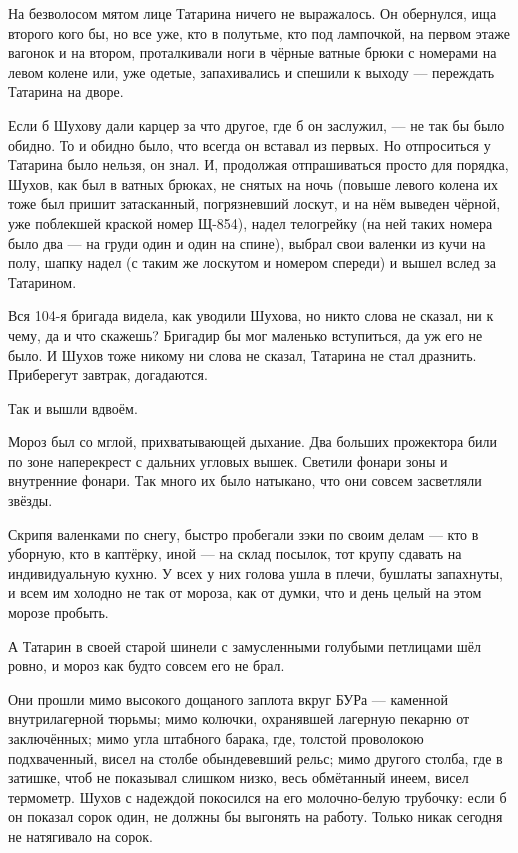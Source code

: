 На безволосом мятом лице Татарина ничего не выражалось. Он обернулся, ища второго кого бы, но
все уже, кто в полутьме, кто под лампочкой, на первом этаже вагонок и на втором, проталкивали
ноги в чёрные ватные брюки с номерами на левом колене или, уже одетые, запахивались и спешили
к выходу --- переждать Татарина на дворе.

Если б Шухову дали карцер за что другое, где б он заслужил, --- не так бы было обидно. То и
обидно было, что всегда он вставал из первых. Но отпроситься у Татарина было нельзя, он знал.
И, продолжая отпрашиваться просто для порядка, Шухов, как был в ватных брюках, не снятых на
ночь (повыше левого колена их тоже был пришит затасканный, погрязневший лоскут, и на нём
выведен чёрной, уже поблекшей краской номер Щ-854), надел телогрейку (на ней таких номера было
два --- на груди один и один на спине), выбрал свои валенки из кучи на полу, шапку надел (с таким
же лоскутом и номером спереди) и вышел вслед за Татарином.

Вся 104-я бригада видела, как уводили Шухова, но никто слова не сказал, ни к чему, да и что
скажешь? Бригадир бы мог маленько вступиться, да уж его не было. И Шухов тоже никому ни слова
не сказал, Татарина не стал дразнить. Приберегут завтрак, догадаются.

Так и вышли вдвоём.

Мороз был со мглой, прихватывающей дыхание. Два больших прожектора били по зоне наперекрест
с дальних угловых вышек. Светили фонари зоны и внутренние фонари. Так много их было натыкано,
что они совсем засветляли звёзды.

Скрипя валенками по снегу, быстро пробегали зэки по своим делам --- кто в уборную, кто в
каптёрку, иной --- на склад посылок, тот крупу сдавать на индивидуальную кухню. У всех у них
голова ушла в плечи, бушлаты запахнуты, и всем им холодно не так от мороза, как от думки, что и
день целый на этом морозе пробыть.

А Татарин в своей старой шинели с замусленными голубыми петлицами шёл ровно, и мороз как
будто совсем его не брал.

Они прошли мимо высокого дощаного заплота вкруг БУРа --- каменной внутрилагерной тюрьмы;
мимо колючки, охранявшей лагерную пекарню от заключённых; мимо угла штабного барака, где,
толстой проволокою подхваченный, висел на столбе обындевевший рельс; мимо другого столба,
где в затишке, чтоб не показывал слишком низко, весь обмётанный инеем, висел термометр. Шухов
с надеждой покосился на его молочно-белую трубочку: если б он показал сорок один, не должны
бы выгонять на работу. Только никак сегодня не натягивало на сорок.

